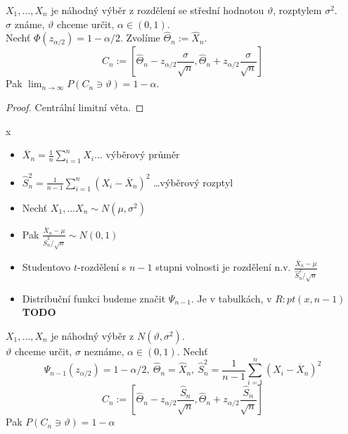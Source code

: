 \documentclass[../main.tex]{subfiles}
\begin{document}
\begin{theorem}
    $X_1,\dots,X_n$ je náhodný výběr z rozdělení se střední hodnotou $\vartheta$, rozptylem $\sigma^2$.\\
    $\sigma$ známe, $\vartheta$ chceme určit, $\alpha \in (0,1)$.\\
    Nechť $\Phi(z_{\alpha/2}) = 1 - \alpha / 2$. Zvolíme $\widehat{\Theta}_n := \widehat{X}_n$.
    \[C_n := \left[\widehat{\Theta}_n - z_{\alpha/2}\frac{\sigma}{\sqrt{n}}, \widehat{\Theta}_n + z_{\alpha/2}\frac{\sigma}{\sqrt{n}}\right]\]
    Pak $\lim_{n \rightarrow \infty} P(C_n \ni \vartheta) = 1 - \alpha$.
\end{theorem}
\begin{proof}
    Centrální limitní věta.
\end{proof}

\begin{definition}
    {\color{white} x}
    \begin{itemize}
        \item $\overline{X}_n = \frac{1}{n} \sum^n_{i=1} X_i \dots$ výběrový průměr
        \item $\widehat{S}^2_n = \frac{1}{n-1}\sum^n_{i=1} (X_i - \overline{X}_n)^2$ \dots výběrový rozptyl
    \end{itemize}
    \begin{itemize}
        \item Nechť $X_1, \dots X_n \sim N(\mu,\sigma^2)$
        \item Pak $\frac{\overline{X}_n - \mu}{\widehat{S}^2_n/\sqrt{n}} \sim N(0,1)$
        \item Studentovo $t$-rozdělení s $n-1$ stupni volnosti je rozdělení n.v.
            $\frac{\overline{X}_n - \mu}{\widehat{S}^2_n/\sqrt{n}}$
        \item Distribuční funkci budeme značit $\Psi_{n-1}$. Je v tabulkách, v $R:pt(x,n-1)$\textbf{TODO}
    \end{itemize}
\end{definition}

\begin{theorem}
    $X_1,\dots,X_n$ je náhodný výběr z $N(\vartheta,\sigma^2)$.\\
    $\vartheta$ chceme určit, $\sigma$ neznáme, $\alpha \in (0,1).$ Nechť
    \[\Psi_{n-1}(z_{\alpha/2}) = 1 - \alpha/2,\ \widehat{\Theta}_n =
    \widehat{X}_n,\ \widehat{S}^2_n = \frac{1}{n-1} \sum^n_{i=1} (X_i - \overline{X}_n)^2\]
    \[C_n := \left[\widehat{\Theta}_n - z_{\alpha/2} \frac{\widehat{S}_n}{\sqrt{n}}, \widehat{\Theta}_n + z_{\alpha/2}\frac{\widehat{S}_n}{\sqrt{n}}\right]\]
    Pak $P(C_n \ni \vartheta) = 1 - \alpha$
\end{theorem}
\end{document}

